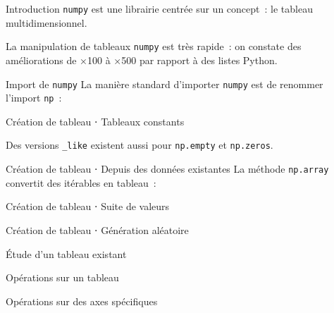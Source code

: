 \begin{frame}{Introduction}
  \texttt{numpy} est une librairie centrée sur un concept~: le tableau multidimensionnel.

  La manipulation de tableaux \texttt{numpy} est très rapide~: on constate des améliorations de ×100 à ×500 par rapport à des listes Python.
\end{frame}

\begin{frame}{Import de \texttt{numpy}}
  La manière standard d'importer \texttt{numpy} est de renommer l'import \texttt{np}~:

\end{frame}

\begin{frame}{Création de tableau ⋅ Tableaux constants}

  Des versions \texttt{\_like} existent aussi pour \texttt{np.empty} et \texttt{np.zeros}.
\end{frame}

\begin{frame}{Création de tableau ⋅ Depuis des données existantes}
  La méthode \texttt{np.array} convertit des itérables en tableau~:

\end{frame}

\begin{frame}{Création de tableau ⋅ Suite de valeurs}
\end{frame}

\begin{frame}{Création de tableau ⋅ Génération aléatoire}
\end{frame}

\begin{frame}{Étude d'un tableau existant}
\end{frame}

\begin{frame}{Opérations sur un tableau}
\end{frame}

\begin{frame}{Opérations sur des axes spécifiques}
\end{frame}

